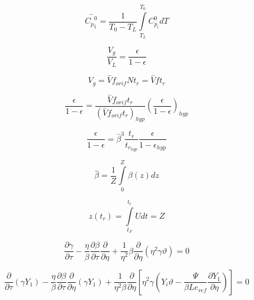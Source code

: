 \begin{equation}
 \stackrel{-}{{C_p}_{i}^{0}}=\frac{1}{{T}_{0}-{T}_{L}}\underset{{T}_{L}}{\overset{{T}_{0}}{\int }}{C}_{{p}_{i}}^{0}dT 
\end{equation}

\begin{equation}
 \frac{{V}_{g}}{{V}_{L}} = \frac{\epsilon }{1-\epsilon } 
\end{equation}

\begin{equation}
  {V}_{g}=\stackrel{-}{V}{f}_{orif}N{t}_{r}=\stackrel{-}{V}f{t}_{r}   
\end{equation}

\begin{equation}
 \frac{\epsilon }{1-\epsilon }= \frac{ \stackrel{-}{V}{f}_{orif}{t}_{r}}{\left({\stackrel{-}{V}f}_{orif}{t}_{r}\right)_{hyp}}\left(\frac{\epsilon}{1-{\epsilon }}\right)_{hyp} 
\end{equation}

\begin{equation} 
\frac{\epsilon }{1-\epsilon }=\stackrel{-}\beta^{3} \frac{{t}_{r}}{{t}_{{r}_{hyp }}}\frac{{\epsilon }}{1-{\epsilon }_{hyp}} 
\end{equation} 

\begin{equation} 
 \stackrel{-}{\beta }=\frac{1}{Z}\underset{0}{\overset{Z}{\int }}\beta \left(z\right)dz
\end{equation} 
 
\begin{equation}  
 z\left({t}_{r}\right)=\underset{{t}_{F}}{\overset{{t}_{r}}{\int }}Udt=Z \end{equation} 
 
\begin{equation}
 \frac{\partial \gamma }{\partial \tau }- \frac{\eta }{\beta }\frac{\partial \beta }{\partial \tau }\frac{\partial }{\partial \eta } +\frac{1}{{\eta}^{2}}\beta \frac{\partial }{\partial \eta }\left({\eta}^{2}\gamma \vartheta \right)=0 
\end{equation}



\begin{equation}
 \frac{\partial }{\partial \tau }\left({\gamma }{Y}_{1}\right)-\frac{\eta}{\beta }\frac{\partial \beta }{\partial \tau }\frac{\partial }{\partial \eta }\left(\gamma {Y}_{1}\right)+\frac{1}{{\eta }^{2}\beta }\frac{\partial }{\partial \eta }\left[{\eta }^{2}\gamma \left({Y}_{i}\vartheta-   \frac{\Psi }{\beta L{e}_{ref}}\frac{\partial {Y}_{1}}{\partial \eta}\right)\right]=0 
\end{equation}

